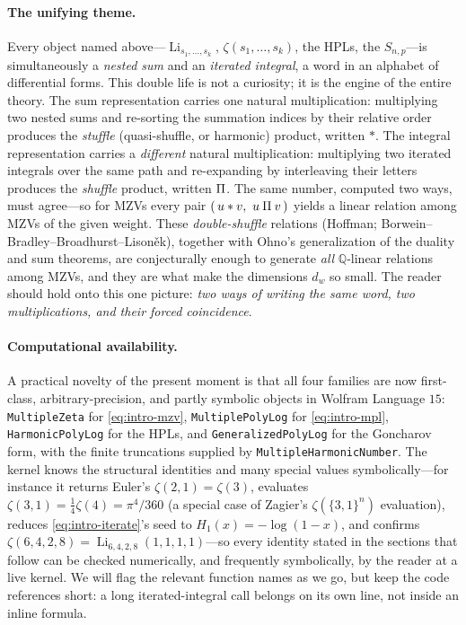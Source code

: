 \documentclass[11pt]{article}
\DeclareMathOperator{\Li}{Li}
\newcommand{\shuffle}{\mathbin{\rotatebox[origin=c]{180}{\ensuremath{\amalg}}}}
\theoremstyle{plain}
\theoremstyle{remark}
\begin{document}
\medskip
\paragraph{The unifying theme.}
Every object named above—$\Li_{s_1,\dots,s_k}$, $\zeta(s_1,\dots,s_k)$, the HPLs,
the $S_{n,p}$—is simultaneously a \emph{nested sum} and an \emph{iterated
integral}, a word in an alphabet of differential forms. This double life is not a
curiosity; it is the engine of the entire theory. The sum representation carries
one natural multiplication: multiplying two nested sums and re-sorting the summation
indices by their relative order produces the \emph{stuffle} (quasi-shuffle, or
harmonic) product, written $\ast$. The integral representation carries a
\emph{different} natural multiplication: multiplying two iterated integrals over
the same path and re-expanding by interleaving their letters produces the
\emph{shuffle} product, written $\shuffle$. The same number, computed two ways,
must agree—so for MZVs every pair $(\,u\ast v,\ u\shuffle v\,)$ yields a linear
relation among MZVs of the given weight. These \emph{double-shuffle} relations
(Hoffman; Borwein--Bradley--Broadhurst--Lison\v{e}k), together with Ohno's
generalization of the duality and sum theorems, are conjecturally enough to
generate \emph{all} $\mathbb{Q}$-linear relations among MZVs, and they are what
make the dimensions $d_w$ so small. The reader should hold onto this one picture:
\emph{two ways of writing the same word, two multiplications, and their forced
coincidence}.

\medskip
\paragraph{Computational availability.}
A practical novelty of the present moment is that all four families are now
first-class, arbitrary-precision, and partly symbolic objects in Wolfram Language
$15$: \texttt{MultipleZeta} for \eqref{eq:intro-mzv}, \texttt{MultiplePolyLog} for
\eqref{eq:intro-mpl}, \texttt{HarmonicPolyLog} for the HPLs, and
\texttt{GeneralizedPolyLog} for the Goncharov form, with the finite truncations
supplied by \texttt{MultipleHarmonicNumber}. The kernel knows the structural
identities and many special values symbolically—for instance it returns Euler's
$\zeta(2,1)=\zeta(3)$, evaluates $\zeta(3,1)=\tfrac14\zeta(4)=\pi^4/360$ (a special
case of Zagier's $\zeta(\{3,1\}^n)$ evaluation), reduces
\eqref{eq:intro-iterate}'s seed to $H_{1}(x)=-\log(1-x)$, and confirms
$\zeta(6,4,2,8)=\Li_{6,4,2,8}(1,1,1,1)$—so every identity stated in the sections
that follow can be checked numerically, and frequently symbolically, by the reader
at a live kernel. We will flag the relevant function names as we go, but keep the
code references short: a long iterated-integral call belongs on its own line, not
inside an inline formula.
\end{document}
